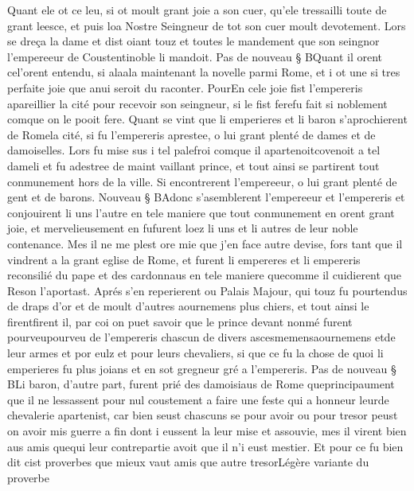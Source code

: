 \documentclass{article}
\begin{document}
\begin{pages}
   Quant ele ot ce leu, si ot moult grant joie a son cuer, qu’ele tressailli 
   toute de grant leesce, et puis loa Nostre Seingneur de tot son cuer moult devotement. 
   Lors se dreça la dame et dist oiant touz et toutes 
   le mandement que 
      son seingnor l’empereeur de Coustentinoble 
      li mandoit. \pend
\pstart Pas de nouveau § BQuant il 
   orent cel'orent entendu, si 
   alaala maintenant la novelle parmi Rome, 
   et i ot une si tres perfaite joie que anui seroit du raconter. 
   PourEn cele joie fist l’empereris 
   apareillier la cité pour recevoir 
   son seingneur, si le fist ferefu fait 
   si noblement comque on le pooit fere. 
   Quant se vint que li emperieres et li baron 
   s’aprochierent 
   de Romela cité, 
   si fu l’empereris aprestee, o lui grant plenté de dames et de damoiselles. 
   Lors fu mise sus i tel palefroi comque il 
   apartenoitcovenoit a 
   tel dameli et fu adestree de maint vaillant prince, 
   et tout ainsi se partirent tout conmunement hors de la ville. Si encontrerent 
   l’empereeur, o lui grant plenté de gent et 
   de barons. Nouveau § BAdonc s’asemblerent 
   l’empereeur et l’empereris et conjouirent li uns l’autre 
   en tele maniere que tout conmunement en orent grant joie, et mervelieusement en 
   fufurent loez li uns et li autres de leur noble contenance. 
   Mes il ne me plest ore mie que j’en face autre devise, fors tant que il vindrent a la grant eglise de 
   Rome, et furent li empereres et 
   li empereris reconsilié du pape et des cardonnaus en tele maniere 
   quecomme il cuidierent que Reson l’aportast. Aprés s’en reperierent ou 
   Palais Majour, qui touz fu pourtendus de draps d’or et de moult d’autres aournemens plus chiers, 
   et tout ainsi le firentfirent il, par coi on puet savoir que le prince devant 
   nonmé furent pourveupourveu de l'empereris chascun de divers 
   ascesmemensaournemens 
      etde leur armes et por eulz et pour leurs chevaliers, 
   si que ce fu la chose de quoi li emperieres fu plus joians et en 
   sot gregneur gré a l’empereris. \pend
\pstart Pas de nouveau § BLi baron, d’autre part, furent prié des damoisiaus de 
   Rome queprincipaument que il ne lessassent 
   pour nul coustement a faire une feste qui a honneur leurde chevalerie apartenist, 
   car bien seust chascuns se pour avoir ou pour tresor peust on avoir mis guerre a fin dont i eussent la leur mise et assouvie, 
   mes il virent bien aus amis quequi leur contrepartie avoit que 
   il n’i eust mestier. Et pour ce fu bien dit cist proverbes que 
   mieux vaut amis que autre tresorLégère variante du proverbe

\end{pages}
\end{document}
